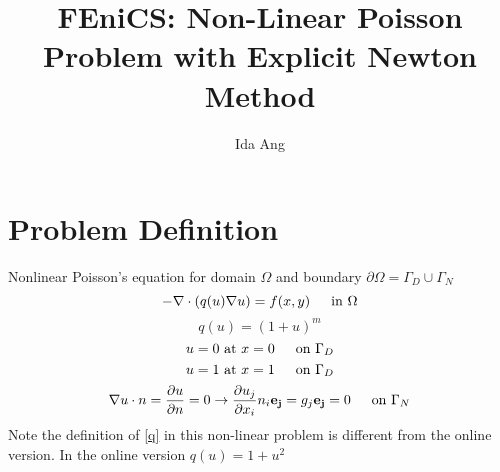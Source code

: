 \documentclass[12pt,3p]{article}
\begin{document}
\title{FEniCS: Non-Linear Poisson Problem with Explicit Newton Method}
\author{Ida Ang}
\date{\vspace{-5ex}}
\maketitle

\section{Problem Definition}
Nonlinear Poisson's equation for domain $\Omega$ and boundary $\partial \Omega = \Gamma_D \cup \Gamma_N$
\begin{equation}\label{ProbDef1}
- \nabla \cdot (q(u) \nabla u ) = f(x,y)  \indent \text{in } \Omega
\end{equation}
\begin{equation}\label{q}
q(u) = (1 + u)^m
\end{equation} 
\begin{equation}\label{ProbDefD1}
u = 0 \text{ at } x = 0 \indent  \text{on } \Gamma_D
\end{equation}
\begin{equation}\label{ProbDefD2}
u = 1 \text{ at } x = 1\indent  \text{on } \Gamma_D
\end{equation}
\begin{equation}\label{NBoundInd}
\nabla u \cdot n = \pdv{u}{n} = 0 \rightarrow \pdv{u_j}{x_i} n_i \mathbf{e_j} = g_j \mathbf{e_j} =  0 \indent \text{on } \Gamma_N
\end{equation}
Note the definition of \ref{q} in this non-linear problem is different from the online version. In the online version $q(u) = 1 + u^2$ 
\end{document}
